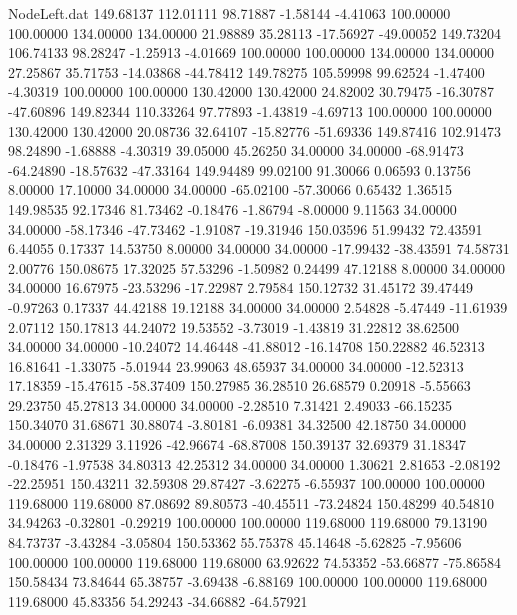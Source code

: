 \begin{filecontents}{NodeLeft.dat}
 149.68137  112.01111   98.71887    -1.58144   -4.41063  100.00000  100.00000  134.00000  134.00000   21.98889   35.28113  -17.56927  -49.00052
 149.73204  106.74133   98.28247    -1.25913   -4.01669  100.00000  100.00000  134.00000  134.00000   27.25867   35.71753  -14.03868  -44.78412
 149.78275  105.59998   99.62524    -1.47400   -4.30319  100.00000  100.00000  130.42000  130.42000   24.82002   30.79475  -16.30787  -47.60896
 149.82344  110.33264   97.77893    -1.43819   -4.69713  100.00000  100.00000  130.42000  130.42000   20.08736   32.64107  -15.82776  -51.69336
 149.87416  102.91473   98.24890    -1.68888   -4.30319   39.05000   45.26250   34.00000   34.00000  -68.91473  -64.24890  -18.57632  -47.33164
 149.94489   99.02100   91.30066     0.06593    0.13756    8.00000   17.10000   34.00000   34.00000  -65.02100  -57.30066    0.65432    1.36515
 149.98535   92.17346   81.73462    -0.18476   -1.86794   -8.00000    9.11563   34.00000   34.00000  -58.17346  -47.73462   -1.91087  -19.31946
 150.03596   51.99432   72.43591     6.44055    0.17337   14.53750    8.00000   34.00000   34.00000  -17.99432  -38.43591   74.58731    2.00776
 150.08675   17.32025   57.53296    -1.50982    0.24499   47.12188    8.00000   34.00000   34.00000   16.67975  -23.53296  -17.22987    2.79584
 150.12732   31.45172   39.47449    -0.97263    0.17337   44.42188   19.12188   34.00000   34.00000    2.54828   -5.47449  -11.61939    2.07112
 150.17813   44.24072   19.53552    -3.73019   -1.43819   31.22812   38.62500   34.00000   34.00000  -10.24072   14.46448  -41.88012  -16.14708
 150.22882   46.52313   16.81641    -1.33075   -5.01944   23.99063   48.65937   34.00000   34.00000  -12.52313   17.18359  -15.47615  -58.37409
 150.27985   36.28510   26.68579     0.20918   -5.55663   29.23750   45.27813   34.00000   34.00000   -2.28510    7.31421    2.49033  -66.15235
 150.34070   31.68671   30.88074    -3.80181   -6.09381   34.32500   42.18750   34.00000   34.00000    2.31329    3.11926  -42.96674  -68.87008
 150.39137   32.69379   31.18347    -0.18476   -1.97538   34.80313   42.25312   34.00000   34.00000    1.30621    2.81653   -2.08192  -22.25951
 150.43211   32.59308   29.87427    -3.62275   -6.55937  100.00000  100.00000  119.68000  119.68000   87.08692   89.80573  -40.45511  -73.24824
 150.48299   40.54810   34.94263    -0.32801   -0.29219  100.00000  100.00000  119.68000  119.68000   79.13190   84.73737   -3.43284   -3.05804
 150.53362   55.75378   45.14648    -5.62825   -7.95606  100.00000  100.00000  119.68000  119.68000   63.92622   74.53352  -53.66877  -75.86584
 150.58434   73.84644   65.38757    -3.69438   -6.88169  100.00000  100.00000  119.68000  119.68000   45.83356   54.29243  -34.66882  -64.57921

\end{filecontents}
